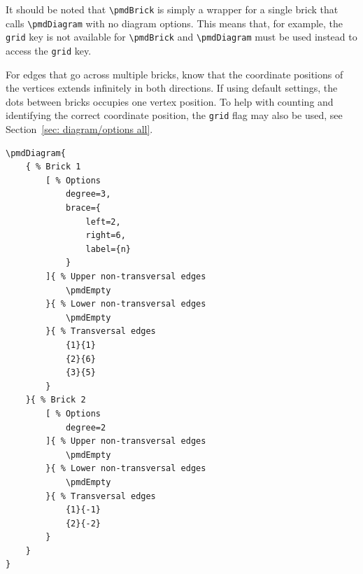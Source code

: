 \documentclass{ltxdoc}
\begin{document}
It should be noted that \verb`\pmdBrick` is simply a wrapper for a single brick that calls \verb`\pmdDiagram` with no diagram options. This means that, for example, the \texttt{grid} key is not available for \verb`\pmdBrick` and \verb`\pmdDiagram` must be used instead to access the \texttt{grid} key.

For edges that go across multiple bricks, know that the coordinate positions of the vertices extends infinitely in both directions. If using default settings, the dots between bricks occupies one vertex position. To help with counting and identifying the correct coordinate position, the \texttt{grid} flag may also be used, see Section~\ref{sec: diagram/options all}.
\begin{center}
    \begin{minipage}{\dimexpr0.85\textwidth-2\fboxrule-2\fboxsep\relax}
        \begin{minipage}[c]{0.4\linewidth}
\begin{verbatim}
\pmdDiagram{
    { % Brick 1
        [ % Options
            degree=3,
            brace={
                left=2,
                right=6,
                label={n}
            }
        ]{ % Upper non-transversal edges
            \pmdEmpty
        }{ % Lower non-transversal edges
            \pmdEmpty
        }{ % Transversal edges
            {1}{1}
            {2}{6}
            {3}{5}
        }
    }{ % Brick 2
        [ % Options
            degree=2
        ]{ % Upper non-transversal edges
            \pmdEmpty
        }{ % Lower non-transversal edges
            \pmdEmpty
        }{ % Transversal edges
            {1}{-1}
            {2}{-2}
        }
    }
}
\end{verbatim}
        \end{minipage}
        \hfill
        \begin{minipage}[c]{0.4\linewidth}
        \end{minipage}
    \end{minipage}%
\end{center}
\begin{center}
\end{center}
\end{document}
